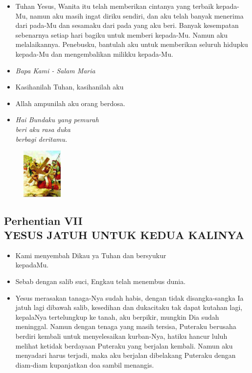 \documentclass[a5paper,headsepline,titlepage,10pt,nnormalheadings,DIVcalc]{scrbook}
\newcommand{\BU}[1]{\begin{itemize} \item[U:] #1 \end{itemize}}
\newcommand{\BP}[1]{\begin{itemize} \item[P:] #1 \end{itemize}}
\begin{document}
\BU{Tuhan  Yesus,  Wanita  itu telah memberikan cintanya yang terbaik kepada-Mu, namun   aku masih ingat diriku sendiri, dan aku telah banyak menerima dari pada-Mu dan sesamaku dari pada yang aku beri. Banyak kesempatan sebenarnya setiap hari bagiku untuk memberi kepada-Mu. Namun aku melalaikannya. Penebusku, bantulah aku untuk memberikan seluruh hidupku kepada-Mu dan mengembalikan milikku kepada-Mu.}

\large\begin{itemize}\item[~]\it{Bapa Kami - Salam Maria}\end{itemize}\normalsize
\BP{Kasihanilah Tuhan, kasihanilah aku}
   \BU{Allah ampunilah aku orang berdosa.}

\begin{itemize}
\item[6.] \it{Hai Bundaku yang pemurah\\beri aku rasa duka\\
    berbagi deritamu.
}\end{itemize}

\begin{figure}
\includegraphics[width=2cm]{jalansalib_files/07_small.jpg}
\end{figure}
\subsection*{Perhentian VII\\
YESUS JATUH UNTUK KEDUA KALINYA}

\BP{   Kami menyembah Dikau ya Tuhan dan bersyukur\\kepadaMu.}
\BU{   Sebab dengan salib suci, Engkau telah menembus dunia.}

\BP{Yesus merasakan tanaga-Nya sudah habis, dengan tidak disangka-sangka Ia jatuh lagi dibawah salib, kesedihan dan dukacitaku tak dapat kutahan lagi, kepalaNya tertelungkup ke tanah, aku berpikir, mungkin Dia sudah meninggal. Namun dengan tenaga yang masih tersisa, Puteraku berusaha berdiri kembali untuk menyelesaikan kurban-Nya, hatiku hancur luluh melihat ketidak berdayaan Puteraku yang berjalan kembali. Namun aku menyadari harus terjadi, maka aku berjalan dibelakang Puteraku dengan diam-diam kupanjatkan doa sambil menangis.}
\end{document}
